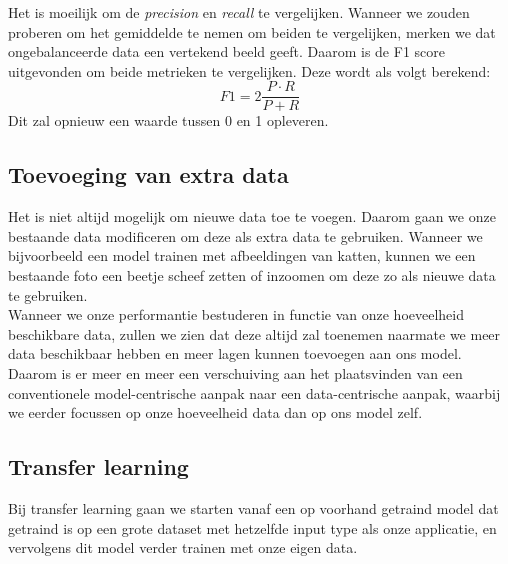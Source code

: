 Het is moeilijk om de \textit{precision} en \textit{recall} te vergelijken. Wanneer we zouden proberen om het gemiddelde te nemen om beiden te vergelijken, merken we dat ongebalanceerde data een vertekend beeld geeft. Daarom is de F1 score uitgevonden om beide metrieken te vergelijken. Deze wordt als volgt berekend:
\begin{equation}
	F1 = 2\frac{P\cdot R}{P +R}
\end{equation}
\noindent
Dit zal opnieuw een waarde tussen 0 en 1 opleveren.

\subsection{Toevoeging van extra data}

Het is niet altijd mogelijk om nieuwe data toe te voegen. Daarom gaan we onze bestaande data modificeren om deze als extra data te gebruiken. Wanneer we bijvoorbeeld een model trainen met afbeeldingen van katten, kunnen we een bestaande foto een beetje scheef zetten of inzoomen om deze zo als nieuwe data te gebruiken. \\
\newline
Wanneer we onze performantie bestuderen in functie van onze hoeveelheid beschikbare data, zullen we zien dat deze altijd zal toenemen naarmate we meer data beschikbaar hebben en meer lagen kunnen toevoegen aan ons model. Daarom is er meer en meer een verschuiving aan het plaatsvinden van een conventionele model-centrische aanpak naar een data-centrische aanpak, waarbij we eerder focussen op onze hoeveelheid data dan op ons model zelf.

\subsection{Transfer learning}

Bij transfer learning gaan we starten vanaf een op voorhand getraind model dat getraind is op een grote dataset met hetzelfde input type als onze applicatie, en vervolgens dit model verder trainen met onze eigen data.
